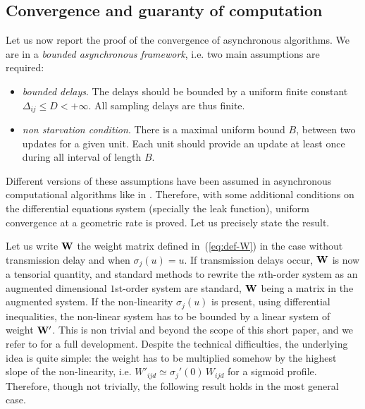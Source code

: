 \subsection{Convergence and guaranty of computation}

Let us now report the proof of the convergence of asynchronous algorithms. We are in a {\em bounded asynchronous framework}, i.e. two main assumptions are required: \begin{itemize}
\item {\em bounded delays}. The delays should be bounded by a uniform finite constant $\Delta_{ij} \leq D < +\infty$. All sampling delays are thus finite.
\item {\em non starvation condition}. There is a maximal uniform bound $B$, between two updates for a given unit. Each unit should provide an update at least once during all interval of length $B$.
\end{itemize}
Different versions of these assumptions have been assumed in asynchronous computational algorithms like in \cite{Chazan:1969}. 
Therefore, with some additional conditions on the differential equations system (specially the leak function), uniform convergence at a geometric rate is proved. Let us precisely state the result.

Let us write ${\bf W}$ the weight matrix defined in~(\ref{eq:def-W}) in the case without transmission delay and when $\sigma_j(u) = u$. If transmission delays occur, ${\bf W}$ is now a tensorial quantity, and standard methods to rewrite the $n$th-order system as an augmented dimensional $1$st-order system are standard, ${\bf W}$ being a matrix in the augmented system. If the non-linearity $\sigma_j(u)$ is present, using differential inequalities, the non-linear system has to be bounded by a linear system of weight ${\bf W}'$. This is non trivial and beyond the scope of this short paper, and we refer to \cite{Mitra:1987} for a full development. Despite the technical difficulties, the underlying idea is quite simple: the weight has to be multiplied somehow by the highest slope of the non-linearity, i.e. $W'_{ijd} \simeq \sigma_j'(0) \, W_{ijd}$ for a sigmoid profile. Therefore, though not trivially, the following result holds in the most general case.

